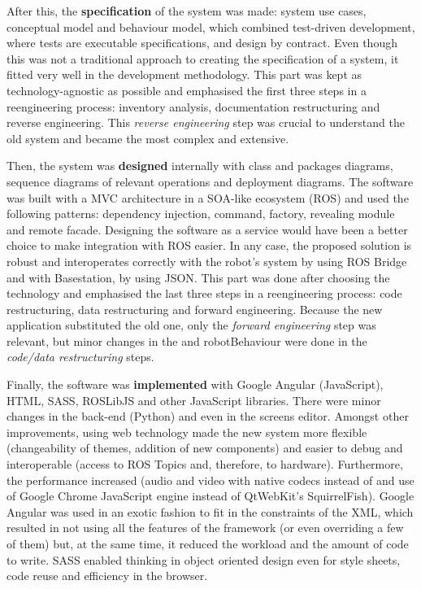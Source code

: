 After this, the \textbf{specification} of the system was made: system use cases, conceptual model and behaviour model, which combined test-driven development, where tests are executable specifications, and design by contract.
Even though this was not a traditional approach to creating the specification of a system, it fitted very well in the development methodology.
This part was kept as technology-agnostic as possible and emphasised the first three steps in a reengineering process: inventory analysis, documentation restructuring and reverse engineering.
This \emph{reverse engineering} step was crucial to understand the old system and became the most complex and extensive.

Then, the system was \textbf{designed} internally with class and packages diagrams, sequence diagrams of relevant operations and deployment diagrams.
The software was built with a \ac{MVC} architecture in a \ac{SOA}-like ecosystem (\ac{ROS}) and used the following patterns: dependency injection, command, factory, revealing module and remote facade.
Designing the software as a service would have been a better choice to make integration with \ac{ROS} easier.
In any case, the proposed solution is robust and interoperates correctly with the robot's system by using ROS Bridge and with Basestation, by using JSON.
This part was done after choosing the technology and emphasised the last three steps in a reengineering process: code restructuring, data restructuring and forward engineering.
Because the new application substituted the old one, only the \emph{forward engineering} step was relevant, but minor changes in the \flangobe and robotBehaviour were done in the \emph{code/data restructuring} steps.

Finally, the software was \textbf{implemented} with Google Angular (JavaScript), \ac{HTML}, \ac{SASS}, ROSLibJS and other JavaScript libraries.
There were minor changes in the back-end (Python) and even in the screens editor.
Amongst other improvements, using web technology made the new system more flexible (changeability of themes, addition of new components) and easier to debug and interoperable (access to ROS Topics and, therefore, to hardware).
Furthermore, the performance increased (audio and video with native codecs instead of \flash and use of Google Chrome JavaScript engine instead of QtWebKit's SquirrelFish).
Google Angular was used in an exotic fashion to fit in the constraints of the \ac{XML}, which resulted in not using all the features of the framework (or even overriding a few of them) but, at the same time, it reduced the workload and the amount of code to write.
\ac{SASS} enabled thinking in object oriented design even for style sheets, code reuse and efficiency in the browser.

